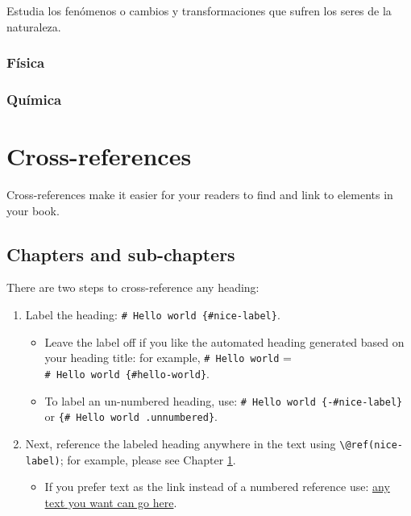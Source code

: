 \documentclass[
]{book}
\providecommand{\tightlist}{%
  \setlength{\itemsep}{0pt}\setlength{\parskip}{0pt}}
\theoremstyle{definition}
\theoremstyle{definition}
\theoremstyle{definition}
\theoremstyle{definition}
\theoremstyle{remark}
\begin{document}
Estudia los fenómenos o cambios y transformaciones que sufren los seres de la naturaleza.

\hypertarget{fuxedsica}{%
\subsection{Física}\label{fuxedsica}}

\hypertarget{quuxedmica}{%
\subsection{Química}\label{quuxedmica}}

\hypertarget{cross}{%
\chapter{Cross-references}\label{cross}}

Cross-references make it easier for your readers to find and link to elements in your book.

\hypertarget{chapters-and-sub-chapters}{%
\section{Chapters and sub-chapters}\label{chapters-and-sub-chapters}}

There are two steps to cross-reference any heading:

\begin{enumerate}
\def\labelenumi{\arabic{enumi}.}
\tightlist
\item
  Label the heading: \texttt{\#\ Hello\ world\ \{\#nice-label\}}.

  \begin{itemize}
  \tightlist
  \item
    Leave the label off if you like the automated heading generated based on your heading title: for example, \texttt{\#\ Hello\ world} = \texttt{\#\ Hello\ world\ \{\#hello-world\}}.
  \item
    To label an un-numbered heading, use: \texttt{\#\ Hello\ world\ \{-\#nice-label\}} or \texttt{\{\#\ Hello\ world\ .unnumbered\}}.
  \end{itemize}
\item
  Next, reference the labeled heading anywhere in the text using \texttt{\textbackslash{}@ref(nice-label)}; for example, please see Chapter \ref{cross}.

  \begin{itemize}
  \tightlist
  \item
    If you prefer text as the link instead of a numbered reference use: \protect\hyperlink{cross}{any text you want can go here}.
  \end{itemize}
\end{enumerate}
\end{document}
